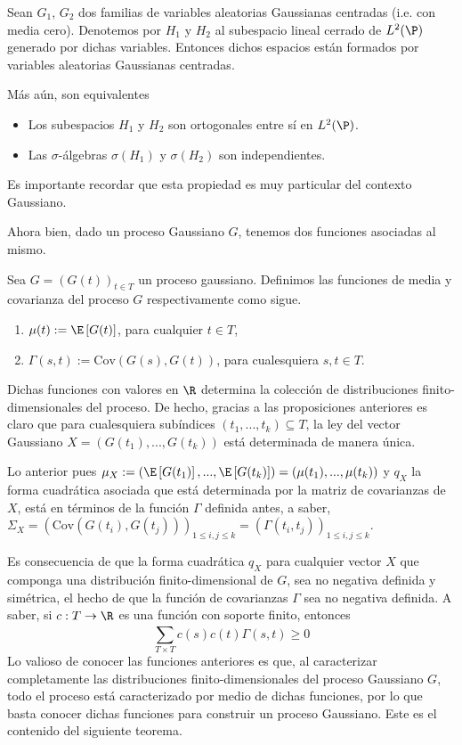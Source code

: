 \begin{prop}\label{Gaussi_indep} 
 Sean $G_1$, $G_2$ dos familias de variables aleatorias Gaussianas centradas (i.e. con media cero). Denotemos por $H_1$ y $H_2$ al subespacio lineal cerrado de $L^{2}(\P)$ generado por dichas variables. Entonces dichos espacios están formados por variables aleatorias Gaussianas centradas.

 Más aún, son equivalentes 
 \begin{itemize}
    \item Los subespacios $H_1$ y $H_2$ son ortogonales entre sí en $L^{2}(\P)$.
    \item Las $\sigma$-álgebras $\sigma(H_1)$ y $\sigma(H_2)$ son independientes.
 \end{itemize}
 Es importante recordar que esta propiedad es muy particular del contexto Gaussiano.
 \end{prop}
Ahora bien, dado un proceso Gaussiano $G$, tenemos dos funciones asociadas al mismo.
\begin{dfn} 
 Sea $G=(G(t))_{t\in T}$ un proceso gaussiano. Definimos las funciones de media y covarianza del proceso $G$ respectivamente como sigue.
 \begin{enumerate}
    \item $\mu(t):=\E\left[G(t)\right]$, \qquad para cualquier $t\in T$,
    \item $\Gamma(s,t):= \text{Cov}\left(G(s),G(t)\right)$, \qquad para cualesquiera $s,t\in T$.
 \end{enumerate}
 \end{dfn}
Dichas funciones con valores en $\R$ determina la colección de distribuciones finito-dimensionales del proceso. 
De hecho, gracias a las proposiciones anteriores es claro que para cualesquiera subíndices $(t_1,...,t_k)\subseteq T$, la ley del vector Gaussiano $X=(G(t_1),...,G(t_k))$ está determinada de manera única. 

Lo anterior pues $\mu_X:=(\E\left[G(t_1)\right],...,\E\left[G(t_k)\right])=(\mu(t_1),...,\mu(t_k))$ y $q_X$ la forma cuadrática asociada que está determinada por la matriz de covarianzas de $X$, está en términos de la función $\Gamma$ definida antes, a saber, $\Sigma_X=\left(\text{Cov}\left(G(t_i),G(t_j)\right)\right)_{1\leq i,j\le k}=\left(\Gamma(t_i,t_j)\right)_{1\le i,j\le k }$.

Es consecuencia de que la forma cuadrática $q_X$ para cualquier vector $X$ que componga una distribución finito-dimensional de $G$, sea no negativa definida y simétrica, el hecho de que la función de covarianzas $\Gamma$ sea no negativa definida. A saber, si $c:T\to \R$ es una función con soporte finito, entonces 
\[  
    \sum_{T\times T}^{}c(s)c(t)\Gamma(s,t)\geq0
\]
Lo valioso de conocer las funciones anteriores es que, al caracterizar completamente las distribuciones finito-dimensionales del proceso Gaussiano $G$, todo el proceso está caracterizado por medio de dichas funciones, por lo que basta conocer dichas funciones para construir un proceso Gaussiano. Este es el contenido del siguiente teorema.

